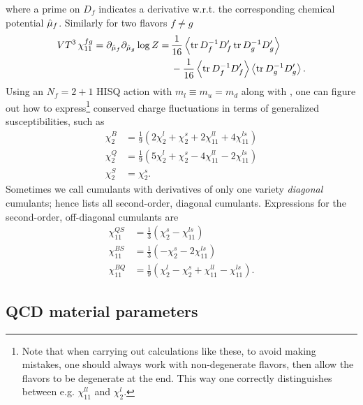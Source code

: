 where a prime on $D_f$ indicates a derivative w.r.t. the corresponding chemical
potential $\hat{\mu}_f$. Similarly for two flavors $f\neq g$ 
\begin{equation}\begin{aligned}
  VT^3\,\chi_{11}^{fg} =\partial_{\muh_f}\partial_{\muh_g}\log Z
                 = \,& \frac{1}{16}\ev{\tr D_f^{-1}D_f'\tr D_g^{-1}D_g'} \\
                   & -\frac{1}{16}\ev{\tr D_f^{-1}D_f'}\ev{\tr D_g^{-1}D_g'}.
\end{aligned}\end{equation}
Using an $N_f=2+1$ HISQ action with $m_l\equiv m_u=m_d$ along with 
, one can figure out how to 
express\footnote{Note that when carrying out calculations like these, to avoid making mistakes,
one should always work with non-degenerate flavors, then allow the flavors to be
degenerate at the end. This way one correctly distinguishes between e.g.
$\chi_{11}^{ll}$ and $\chi_2^l$.} conserved charge fluctuations in terms of 
generalized susceptibilities, such as
\begin{equation}\begin{aligned}\label{eq:2ndorderdiagonal}
  \chi_2^B&=\frac{1}{9}\left(2\chi_2^l+\chi_2^s+2\chi_{11}^{ll}+4\chi_{11}^{ls}\right)\\
  \chi_2^Q&=\frac{1}{9}\left(5\chi_2^l+\chi_2^s-4\chi_{11}^{ll}-2\chi_{11}^{ls}\right)\\
  \chi_2^S&=\chi_2^s.
\end{aligned}\end{equation}
Sometimes we call cumulants with derivatives of only one variety
{\it diagonal} cumulants; hence
 lists all second-order, diagonal cumulants.
Expressions for the second-order, off-diagonal cumulants are
\begin{equation}\begin{aligned}
\chi^{QS}_{11}&=\frac{1}{3}\left(\chi^{s}_{2}-\chi^{ls}_{11}\right)\\
\chi^{BS}_{11}&=\frac{1}{3}\left(-\chi^{s}_{2}-2\chi^{ls}_{11}\right)\\
\chi^{BQ}_{11}&=\frac{1}{9}\left(\chi^{l}_{2}-\chi^{s}_{2}+\chi^{ll}_{11}-\chi^{ls}_{11}\right).
\end{aligned}\end{equation}




\subsection{QCD material parameters}


